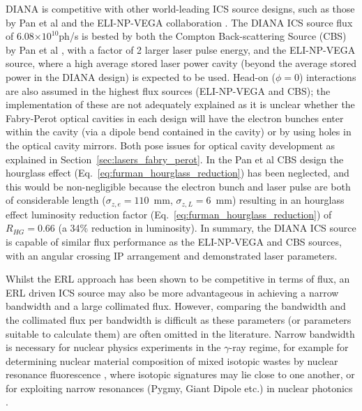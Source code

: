 \documentclass[../main.tex]{subfiles}
\begin{document}
DIANA is competitive with other world-leading ICS source designs, such as those by Pan et al \cite{pan2019design} and the ELI-NP-VEGA collaboration \cite{elinp2019vega,tanaka2020current}. The DIANA ICS source flux of 6.08$\times 10^{10}$ph/\si{\second} is bested by both the Compton Back-scattering Source (CBS) by Pan et al \cite{pan2019design}, with a factor of 2 larger laser pulse energy, and the ELI-NP-VEGA source, where a high average stored laser power cavity (beyond the average stored power in the DIANA design) is expected to be used. Head-on ($\phi=0$) interactions are also assumed in the highest flux sources (ELI-NP-VEGA and CBS); the implementation of these are not adequately explained as it is unclear whether the Fabry-Perot optical cavities in each design will have the electron bunches enter within the cavity (via a dipole bend contained in the cavity) or by using holes in the optical cavity mirrors. Both pose issues for optical cavity development as explained in Section~\ref{sec:lasers_fabry_perot}. In the Pan et al CBS design\cite{pan2019design} the hourglass effect (Eq.~\ref{eq:furman_hourglass_reduction}) has been neglected, and this would be non-negligible because the electron bunch and laser pulse are both of considerable length ($\sigma_{z,e} = 110$~\si{\milli\meter}, $\sigma_{z,L} = 6$~\si{\milli\meter}) resulting in an hourglass effect luminosity reduction factor (Eq.~\ref{eq:furman_hourglass_reduction}) of $R_{HG} = 0.66$ (a 34\% reduction in luminosity). In summary, the DIANA ICS source is capable of similar flux performance as the ELI-NP-VEGA and CBS sources, with an angular crossing IP arrangement and demonstrated laser parameters. 

Whilst the ERL approach has been shown to be competitive in terms of flux, an ERL driven ICS source may also be more advantageous in achieving a narrow bandwidth and a large collimated flux. However, comparing the bandwidth and the collimated flux per bandwidth is difficult as these parameters (or parameters suitable to calculate them) are often omitted in the literature. Narrow bandwidth is necessary for nuclear physics experiments in the $\gamma$-ray regime, for example for determining nuclear material composition of mixed isotopic wastes by nuclear resonance fluorescence \cite{angell2015demonstration}, where isotopic signatures may lie close to one another, or for exploiting narrow resonances (Pygmy, Giant Dipole etc.) in nuclear photonics \cite{budker2021expanding}. 
\end{document}
